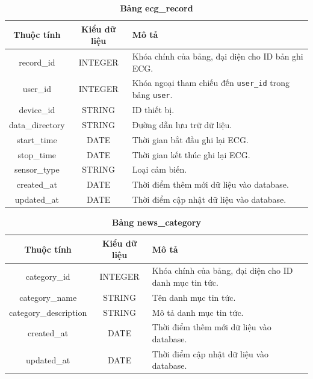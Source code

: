 \begin{table}[H]
  \caption{\bfseries \fontsize{12pt}{0pt}\selectfont Bảng ecg\_record}
  \centering
  \begin{tabularx}{0.9\textwidth}{|c|c|X|}
    \hline
    \textbf{Thuộc tính} & \textbf{Kiểu dữ liệu} & \textbf{Mô tả} \\
    \hline
    record\_id & INTEGER & Khóa chính của bảng, đại diện cho ID bản ghi ECG. \\
    \hline
    user\_id & INTEGER & Khóa ngoại tham chiếu đến \texttt{user\_id} trong bảng \texttt{user}. \\
    \hline
    device\_id & STRING & ID thiết bị. \\
    \hline
    data\_directory & STRING & Đường dẫn lưu trữ dữ liệu. \\
    \hline
    start\_time & DATE & Thời gian bắt đầu ghi lại ECG. \\
    \hline
    stop\_time & DATE & Thời gian kết thúc ghi lại ECG. \\
    \hline
    sensor\_type & STRING & Loại cảm biến. \\
    \hline
    created\_at & DATE & Thời điểm thêm mới dữ liệu vào database. \\
    \hline
    updated\_at & DATE & Thời điểm cập nhật dữ liệu vào database. \\
    \hline
  \end{tabularx}
\end{table}

\begin{table}[H]
  \caption{\bfseries \fontsize{12pt}{0pt}\selectfont Bảng news\_category}
  \centering
  \begin{tabularx}{0.9\textwidth}{|c|c|X|}
    \hline
    \textbf{Thuộc tính} & \textbf{Kiểu dữ liệu} & \textbf{Mô tả} \\
    \hline
    category\_id & INTEGER & Khóa chính của bảng, đại diện cho ID danh mục tin tức. \\
    \hline
    category\_name & STRING & Tên danh mục tin tức. \\
    \hline
    category\_description & STRING & Mô tả danh mục tin tức. \\
    \hline
    created\_at & DATE & Thời điểm thêm mới dữ liệu vào database. \\
    \hline
    updated\_at & DATE & Thời điểm cập nhật dữ liệu vào database. \\
    \hline
  \end{tabularx}
\end{table}

